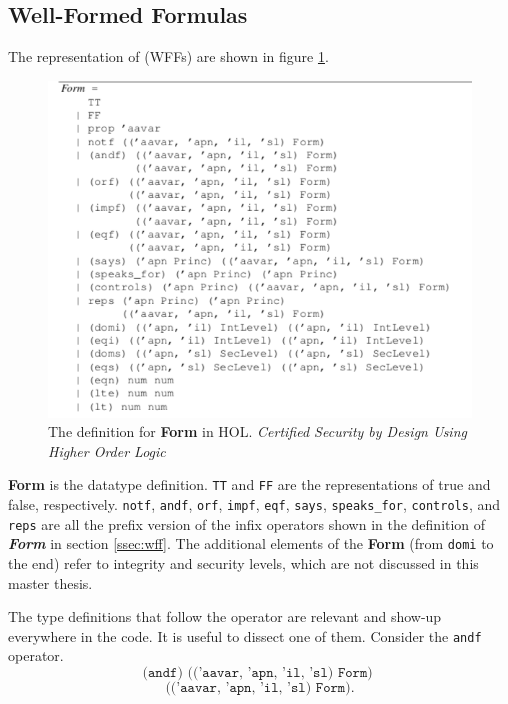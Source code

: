 \documentclass[../../main/main.tex]{subfiles}
\begin{document}
\subsection{Well-Formed Formulas}
The  representation of  (WFFs) are shown in figure \ref{FormACL}.

\begin{figure}[h]
\centering
\includegraphics[width=\textwidth]{../figures/FormACL}
\caption{\label{FormACL}The definition for \textbf{Form} in HOL.   \textit{Certified Security by Design Using Higher Order Logic}\cite{certmanual}}
\end{figure}

\textbf{Form} is the datatype definition.  \texttt{TT}  and \texttt{FF} are the  representations of true and false, respectively.  \texttt{notf}, \texttt{andf}, \texttt{orf}, \texttt{impf}, \texttt{eqf}, \texttt{says}, \texttt{speaks_for}, \texttt{controls}, and \texttt{reps} are all the prefix version of the infix operators shown in the definition of \textbf{\textit{Form}} in section \ref{ssec:wff}.  The additional elements of the \textbf{Form} (from \texttt{domi} to the end) refer to integrity and security levels, which are not discussed in this master thesis. 

The type definitions that follow the operator are relevant and show-up everywhere in the code.  It is useful to dissect one of them.  Consider the \texttt{andf} operator.  
\[ \texttt{(andf) (('aavar, 'apn, 'il, 'sl) Form) }\]
\[ \texttt{(('aavar, 'apn, 'il, 'sl) Form)}. \]
\end{document}
